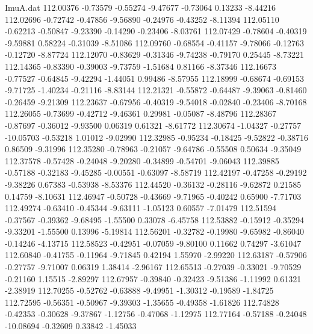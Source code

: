 \begin{filecontents}{ImuA.dat}
 112.00376   -0.73579   -0.55274   -9.47677   -0.73064    0.13233   -8.44216
 112.02696   -0.72742   -0.47856   -9.56890   -0.24976   -0.43252   -8.11394
 112.05110   -0.62213   -0.50847   -9.23390   -0.14290   -0.23406   -8.03761
 112.07429   -0.78604   -0.40319   -9.59881    0.58224   -0.31039   -8.51086
 112.09760   -0.68554   -0.41157   -9.78066   -0.12763   -0.12720   -8.87724
 112.12070   -0.83629   -0.31346   -9.74238   -0.79170    0.25445   -8.73221
 112.14365   -0.83390   -0.39003   -9.73759   -1.51684    0.81166   -8.37346
 112.16673   -0.77527   -0.64845   -9.42294   -1.44051    0.99486   -8.57955
 112.18999   -0.68674   -0.69153   -9.71725   -1.40234   -0.21116   -8.83144
 112.21321   -0.55872   -0.64487   -9.39063   -0.81460   -0.26459   -9.21309
 112.23637   -0.67956   -0.40319   -9.54018   -0.02840   -0.23406   -8.70168
 112.26055   -0.73699   -0.42712   -9.46361    0.29981   -0.05087   -8.48796
 112.28367   -0.87697   -0.36012   -9.93500    0.06319    0.61321   -8.61772
 112.30674   -1.04327   -0.27757  -10.05703   -0.53218    1.01012   -9.02990
 112.32985   -0.95234   -0.18425   -9.52822   -0.38716    0.86509   -9.31996
 112.35280   -0.78963   -0.21057   -9.64786   -0.55508    0.50634   -9.35049
 112.37578   -0.57428   -0.24048   -9.20280   -0.34899   -0.54701   -9.06043
 112.39885   -0.57188   -0.32183   -9.45285   -0.00551   -0.63097   -8.58719
 112.42197   -0.47258   -0.29192   -9.38226    0.67383   -0.53938   -8.53376
 112.44520   -0.36132   -0.28116   -9.62872    0.21585    0.14759   -8.10631
 112.46947   -0.50728   -0.43669   -9.71965   -0.40242    0.65900   -7.71703
 112.49274   -0.63410   -0.45344   -9.63111   -1.05123    0.60557   -7.01479
 112.51594   -0.37567   -0.39362   -9.68495   -1.55500    0.33078   -6.45758
 112.53882   -0.15912   -0.35294   -9.33201   -1.55500    0.13996   -5.19814
 112.56201   -0.32782   -0.19980   -9.65982   -0.86040   -0.14246   -4.13715
 112.58523   -0.42951   -0.07059   -9.80100    0.11662    0.74297   -3.61047
 112.60840   -0.41755   -0.11964   -9.71845    0.42194    1.55970   -2.99220
 112.63187   -0.57906   -0.27757   -9.71007    0.06319    1.38414   -2.96167
 112.65513   -0.27039   -0.33021   -9.70529   -0.21160    1.15515   -2.89297
 112.67957   -0.39840   -0.32423   -9.51386   -1.11992    0.61321   -2.38919
 112.70255   -0.52762   -0.63888   -9.49951   -1.30312   -0.19589   -1.84725
 112.72595   -0.56351   -0.50967   -9.39303   -1.35655   -0.49358   -1.61826
 112.74828   -0.42353   -0.30628   -9.37867   -1.12756   -0.47068   -1.12975
 112.77164   -0.57188   -0.24048  -10.08694   -0.32609    0.33842   -1.45033

\end{filecontents}
